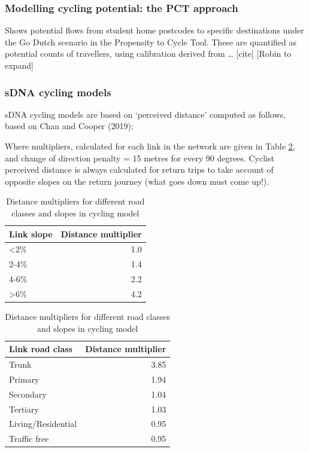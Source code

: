 \documentclass[galley]{jtlu-article-2col}
\begin{document}
\hypertarget{modelling-cycling-potential-the-pct-approach}{%
\subsubsection{Modelling cycling potential: the PCT approach}\label{modelling-cycling-potential-the-pct-approach}}

Shows potential flows from student home postcodes to specific destinations under the Go Dutch scenario in the Propensity to Cycle Tool. These are quantified as potential counts of travellers, using calibration derived from \ldots{} {[}cite{]} {[}Robin to expand{]}

\hypertarget{sdna-cycling-models}{%
\subsubsection{sDNA cycling models}\label{sdna-cycling-models}}

sDNA cycling models are based on `perceived distance' computed as follows, based on Chan and Cooper (2019):

Where multipliers, calculated for each link in the network are given in Table \ref{tab:multipliers}, and change of direction penalty = 15 metres for every 90 degrees.
Cyclist perceived distance is always calculated for return trips to take account of opposite slopes on the return journey (what goes down must come up!).

\begin{table}
\caption{\label{tab:multipliers}Distance multipliers for different road classes and slopes in cycling model}

\centering
\begin{tabular}[t]{lr}
\toprule
Link slope & Distance multiplier\\
\midrule
<2\% & 1.0\\
2-4\% & 1.4\\
4-6\% & 2.2\\
>6\% & 4.2\\
\bottomrule
\end{tabular}
\centering
\begin{tabular}[t]{lr}
\toprule
Link road class & Distance multiplier\\
\midrule
Trunk & 3.85\\
Primary & 1.94\\
Secondary & 1.04\\
Tertiary & 1.03\\
Living/Residential & 0.95\\
\addlinespace
Traffic free & 0.95\\
\bottomrule
\end{tabular}
\end{table}
\end{document}
